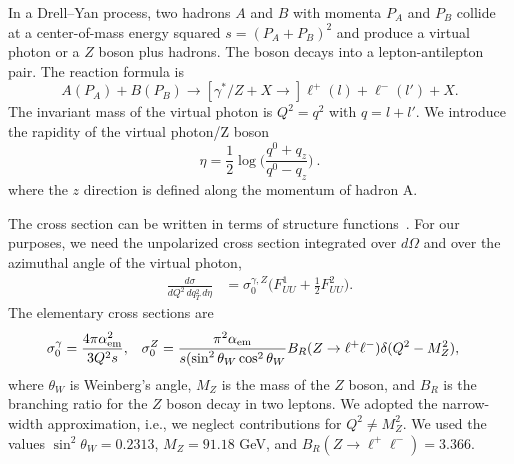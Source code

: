 \documentclass[aps,preprintnumbers,showpacs,nofootinbib,superscriptaddress,floatfix]{revtex4}
\begin{document}
In a Drell--Yan process, two hadrons $A$ and $B$ with momenta $P_A$ and $P_B$
collide at a center-of-mass energy squared $s = (P_A + P_B)^2$ 
and produce a virtual photon or a $Z$ boson plus hadrons. 
The boson decays into a
lepton-antilepton pair. The reaction formula is
\begin{equation}
A(P_A)+B(P_B)\to [\gamma^*/Z + X \to] \ell^+(l) + \ell^-(l') + X.
\end{equation} 
The invariant mass of the virtual photon is $Q^2=q^2$ with $q = l + l'$. 
We introduce the rapidity of the virtual photon/Z boson
\begin{equation}
\eta=\frac{1}{2}\log\bigg(\frac{q^0+q_z}{q^0-q_z}\bigg)\  .
\end{equation} 
where the $z$ direction is defined along the momentum of hadron A.

The cross section can be written in terms of structure
functions~\cite{Boer:2006eq,Arnold:2008kf}. For our purposes, we need the unpolarized 
cross section
integrated over $d\Omega$ and over the azimuthal angle of the virtual photon, 
\begin{align}
\label{e:dsigma_gZ}
\frac{d\sigma}{dQ^2\, dq_T^2\,d\eta} &= \sigma_0^{\gamma,Z}
\bigg(F_{UU}^1 + \frac{1}{2} F_{UU}^2\bigg). 
\end{align} 
The elementary cross sections are
\begin{align}
\sigma_0^{\gamma} &= \frac{4\pi \alpha^2_{\rm em}}{3 Q^2 s},
&
\sigma_0^Z &= 
\frac{\pi^2 \alpha_{\rm em}}{s (\sin^2{\theta_W} \cos^2{\theta_W}}
B_R(Z\rightarrow \ell^+\ell^-)
\delta(Q^2 - M_Z^2), 
\end{align} 
where $\theta_W$ is Weinberg's angle, $M_Z$ is the mass of the $Z$ boson, and
$B_R$ is the branching ratio for the $Z$ boson decay in two leptons.
We adopted the narrow-width approximation, i.e., we neglect contributions for 
$Q^2 \neq M_Z^2$. 
We used the values 
$\sin^2 \theta_W= 0.2313$, $M_Z = 91.18$ GeV, and 
$B_R(Z\rightarrow \ell^+\ell^-)=3.366$.  
\end{document}
